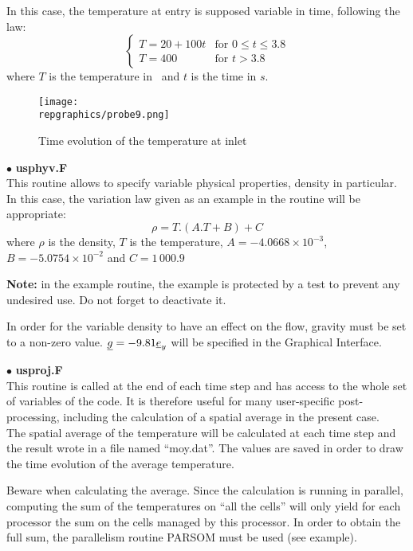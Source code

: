In this case, the temperature at entry is supposed variable in time, following
the law:
\begin{equation}
\left\{\begin{array}{ll}
T = 20 + 100t & \text{for }0\leqslant t \leqslant 3.8\\
T = 400 & \text{for } t > 3.8
\end{array}\right.
\end{equation}
where $T$ is the temperature in \degresC\ and $t$ is the time in $s$.


\begin{figure}[h!]
\begin{center}
\texttt{[image: \\repgraphics/probe9.png]}
\caption{Time evolution of the temperature at inlet}
\label{figp9_e4}
\end{center}
\end{figure}


$\bullet$ {\bfseries usphyv.F}\\
This routine allows to specify variable physical properties, density in
particular. In this case, the variation law given as an example in the routine
will be appropriate:
\begin{equation}
\rho = T.(A.T + B) + C
\end{equation}
where $\rho$ is the density, $T$ is the temperature, $A = -4.0668\times10^{-3}$,
$B =-5.0754\times 10^{-2}$ and $C = 1\,000.9$

\textbf{Note:} in the example routine, the example is protected by a test to prevent any
undesired use. Do not forget to deactivate it.

In order for the variable density to have an effect on the flow, gravity must be
set to a non-zero value. $\underline{g} = -9.81 \underline{e}_y$ will be specified in the
Graphical Interface.


$\bullet$ {\bfseries usproj.F}\\
This routine is called at the end of each time step and has access to the whole
set of variables of the code. It is therefore useful for many user-specific
post-processing, including the calculation of a spatial average in the present
case.\\
The spatial average of the temperature will be calculated at each time step and
the result wrote in a file named ``moy.dat''. The values are saved in order
to draw the time evolution of the average temperature.

Beware when calculating the average. Since the calculation is running in
parallel, computing the sum of the temperatures on ``all the cells'' will only
yield for each processor the sum on the cells managed by this processor. In
order to obtain the full sum, the parallelism routine PARSOM must be used (see
example).


